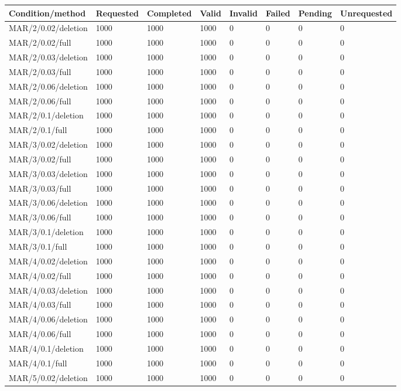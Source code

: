 \begin{longtable}{p{1.5in}p{.6in}p{.6in}p{.5in}p{.5in}p{.5in}p{.6in}p{.7in}}
\toprule
Condition/method & Requested & Completed & Valid & Invalid & Failed & Pending & Unrequested\\\midrule\endhead
MAR/2/0.02/deletion & 1000 & 1000 & 1000 & 0 & 0 & 0 & 0\\
MAR/2/0.02/full & 1000 & 1000 & 1000 & 0 & 0 & 0 & 0\\
MAR/2/0.03/deletion & 1000 & 1000 & 1000 & 0 & 0 & 0 & 0\\
MAR/2/0.03/full & 1000 & 1000 & 1000 & 0 & 0 & 0 & 0\\
MAR/2/0.06/deletion & 1000 & 1000 & 1000 & 0 & 0 & 0 & 0\\
MAR/2/0.06/full & 1000 & 1000 & 1000 & 0 & 0 & 0 & 0\\
MAR/2/0.1/deletion & 1000 & 1000 & 1000 & 0 & 0 & 0 & 0\\
MAR/2/0.1/full & 1000 & 1000 & 1000 & 0 & 0 & 0 & 0\\
MAR/3/0.02/deletion & 1000 & 1000 & 1000 & 0 & 0 & 0 & 0\\
MAR/3/0.02/full & 1000 & 1000 & 1000 & 0 & 0 & 0 & 0\\
MAR/3/0.03/deletion & 1000 & 1000 & 1000 & 0 & 0 & 0 & 0\\
MAR/3/0.03/full & 1000 & 1000 & 1000 & 0 & 0 & 0 & 0\\
MAR/3/0.06/deletion & 1000 & 1000 & 1000 & 0 & 0 & 0 & 0\\
MAR/3/0.06/full & 1000 & 1000 & 1000 & 0 & 0 & 0 & 0\\
MAR/3/0.1/deletion & 1000 & 1000 & 1000 & 0 & 0 & 0 & 0\\
MAR/3/0.1/full & 1000 & 1000 & 1000 & 0 & 0 & 0 & 0\\
MAR/4/0.02/deletion & 1000 & 1000 & 1000 & 0 & 0 & 0 & 0\\
MAR/4/0.02/full & 1000 & 1000 & 1000 & 0 & 0 & 0 & 0\\
MAR/4/0.03/deletion & 1000 & 1000 & 1000 & 0 & 0 & 0 & 0\\
MAR/4/0.03/full & 1000 & 1000 & 1000 & 0 & 0 & 0 & 0\\
MAR/4/0.06/deletion & 1000 & 1000 & 1000 & 0 & 0 & 0 & 0\\
MAR/4/0.06/full & 1000 & 1000 & 1000 & 0 & 0 & 0 & 0\\
MAR/4/0.1/deletion & 1000 & 1000 & 1000 & 0 & 0 & 0 & 0\\
MAR/4/0.1/full & 1000 & 1000 & 1000 & 0 & 0 & 0 & 0\\
MAR/5/0.02/deletion & 1000 & 1000 & 1000 & 0 & 0 & 0 & 0\\

\end{longtable}
